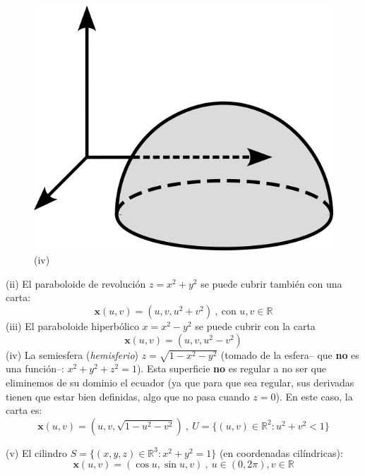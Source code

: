 \begin{mybox}
\begin{figure}
             \includegraphics[scale=.18]{FOTOS/ejemplo2_A_4.png}
             \caption*{(iv)}
         \end{figure}
         (ii) El paraboloide de revolución $z=x^2+y^2$ se puede cubrir también con una carta:
        $$
        \mathbf{x}(u,v)=(u,v,u^2+v^2) \ , \ \text{con }u,v\in \mathbb{R} 
        $$
         (iii) El paraboloide hiperbólico $x=x^2-y^2$ se puede cubrir con la carta 
         $$\mathbf{x}(u,v)=(u,v,u^2-v^2)$$
         (iv) La semiesfera (\emph{hemisferio}) $z=\sqrt{1-x^2-y^2}$ (tomado de la esfera-- que \textbf{no} es una función--: $x^2+y^2+z^2=1$). Esta superficie \textbf{no} es regular a no ser que eliminemos de su dominio el ecuador (ya que para que sea regular, sus derivadas tienen que estar bien definidas, algo que no pasa cuando $z=0$). En este caso, la carta es: 
         $$
         \mathbf{x}(u,v)=\left (u,v,\sqrt{1-u^2-v^2}\right ) \ , \ U=\{ (u,v)\in \mathbb{R}^2 :u^2+v^2<1 \}
         $$
         
         (v) El cilindro $S=\{ (x,y,z)\in \mathbb{R}^3:x^2+y^2=1 \}$ (en coordenadas cilíndricas):
         $$
         \mathbf{x}(u,v)=(\cos u , \sin u , v) \ , \ u \in (0,2\pi),v\in \mathbb{R}
         $$
\end{mybox}
